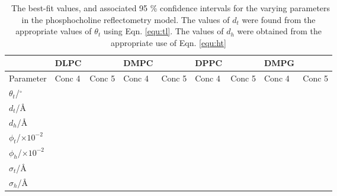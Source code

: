 \documentclass[twoside,twocolumn,9pt]{article}
\begin{document}
\begin{table}
	\small
	\caption{\ The best-fit values, and associated 95 \% confidence intervals for the varying parameters in the phosphocholine reflectometry model. The values of $d_t$ were found from the appropriate values of $\theta_t$ using Eqn. \ref{equ:tl}. The values of $d_h$ were obtained from the appropriate use of Eqn. \ref{equ:ht}}
	\label{tab:liptab}
	\begin{tabular*}{\textwidth}{@{\extracolsep{\fill}}lllllllll}
		\hline
		 & DLPC & & DMPC & & DPPC & & DMPG & \\
		\hline
		Parameter & Conc 4 & Conc 5 & Conc 4 & Conc 5 & Conc 4 & Conc 5 & Conc 4 & Conc 5 \\
		$\theta_t$/$^\circ$ &  &  &  &  &  &  &  &  \\
		$d_t$/\AA &  &  &  &  &  &  &  &  \\
		$d_h$/\AA &  &  &  &  &  &  &  &  \\
		$\phi_t$/$\times10^{-2}$ &  &  &  &  &  &  &  &  \\
		$\phi_h$/$\times10^{-2}$ &  &  &  &  &  &  &  &  \\
		$\sigma_t$/\AA &  &  &  &  &  &  &  &  \\
		$\sigma_h$/\AA &  &  &  &  &  &  &  &  \\
		\hline
	\end{tabular*}
\end{table}
\end{document}
